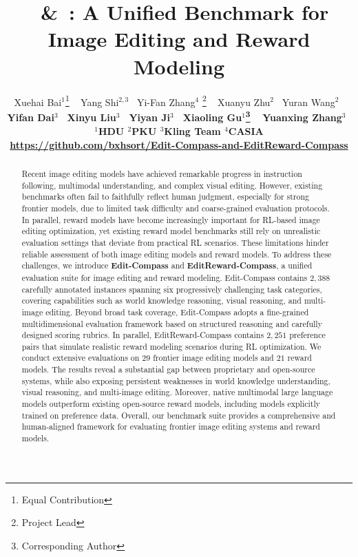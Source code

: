 \documentclass{article}
\title{\bench~\&~\rmbench: A Unified Benchmark for Image Editing and Reward Modeling}
\author{%
    Xuehai Bai$^{1}$\thanks{Equal Contribution} \,\,\,
    Yang Shi$^{2,3}$\footnotemark[1] \,\,\,
    Yi-Fan Zhang$^{4}$\footnotemark[1]\,\,\thanks{Project Lead} \,\,\,
    Xuanyu Zhu$^{2}$ \,
    Yuran Wang$^{2}$ \,
    \\
    \bfseries
    Yifan Dai$^{3}$ \,
    Xinyu Liu$^{3}$ \,
    Yiyan Ji$^{3}$ \,
    Xiaoling Gu$^{1}$\thanks{Corresponding Author} \,\,\,
    Yuanxing Zhang$^{3}$\footnotemark[3] \,\,\,
    \\ 
    $^1$HDU\quad
    $^2$PKU\quad
    $^3$Kling Team\quad
    $^4$CASIA\quad
    \\
    {\centering}
    \url{https://github.com/bxhsort/Edit-Compass-and-EditReward-Compass}
}
\newcommand{\bench}{Edit-Compass}
\newcommand{\rmbench}{EditReward-Compass}
\begin{document}
\maketitle


\begin{abstract}
Recent image editing models have achieved remarkable progress in instruction following, multimodal understanding, and complex visual editing. However, existing benchmarks often fail to faithfully reflect human judgment, especially for strong frontier models, due to limited task difficulty and coarse-grained evaluation protocols. In parallel, reward models have become increasingly important for RL-based image editing optimization, yet existing reward model benchmarks still rely on unrealistic evaluation settings that deviate from practical RL scenarios. These limitations hinder reliable assessment of both image editing models and reward models.
To address these challenges, we introduce \textbf{{\bench}} and \textbf{{\rmbench}}, a unified evaluation suite for image editing and reward modeling. {\bench} contains $2,388$ carefully annotated instances spanning six progressively challenging task categories, covering capabilities such as world knowledge reasoning, visual reasoning, and multi-image editing. Beyond broad task coverage, {\bench} adopts a fine-grained multidimensional evaluation framework based on structured reasoning and carefully designed scoring rubrics. In parallel, {\rmbench} contains $2,251$ preference pairs that simulate realistic reward modeling scenarios during RL optimization.
We conduct extensive evaluations on $29$ frontier image editing models and $21$ reward models. The results reveal a substantial gap between proprietary and open-source systems, while also exposing persistent weaknesses in world knowledge understanding, visual reasoning, and multi-image editing. Moreover, native multimodal large language models outperform existing open-source reward models, including models explicitly trained on preference data. Overall, our benchmark suite provides a comprehensive and human-aligned framework for evaluating frontier image editing systems and reward models.
\end{abstract}



















\newpage

\appendix



 
\end{document}
